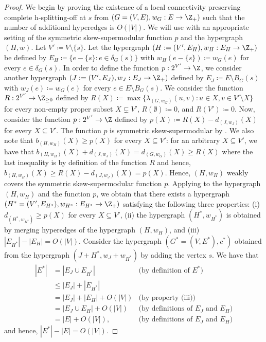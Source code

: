 \begin{proof}
    We begin by proving the existence of a local connectivity preserving complete h-splitting-off at $s$ from $(G=(V, E), w_G: E\rightarrow \Z_+)$ such that the number of additional hyperedges is $O(|V|)$. 
    We will use  with an appropriate setting of the symmetric skew-supermodular function $p$ and the hypergraph $(H, w)$. 
    Let $V'\coloneqq V\setminus \{s\}$. 
    Let the hypergraph $(H:=(V', E_H), w_H: E_H\rightarrow \Z_+)$ be defined by $E_H\coloneqq \{e-\{s\}: e\in \delta_G(s)\}$ with $w_H(e-\{s\})\coloneqq w_G(e)$ for every $e\in \delta_G(s)$. 
    In order to define the function $p: 2^{V'}\rightarrow \Z$, we consider another hypergraph $(J:=({V'}, E_J), w_J: E_J\rightarrow \Z_+)$ defined by $E_J\coloneqq E\setminus B_G(s)$ with $w_J(e)\coloneqq w_G(e)$ for every $e\in E\setminus B_G(s)$. 
    We consider the function $R:2^{V'}\rightarrow \Z_{\ge 0}$ defined by $R(X)\coloneqq \max\{\lambda_{(G, w_G)}(u, v): u\in X, v\in V'\setminus X\}$ for every non-empty proper subset $X\subsetneq  V'$, $R(\emptyset)\coloneqq 0$, and $R(V')\coloneqq 0$. 
    Now, consider the function $p: 2^{V'}\rightarrow \Z$ defined by $p(X)\coloneqq R(X)-d_{(J, w_J)}(X)$ for every $X\subseteq {V'}$. 
    The function $p$ is symmetric skew-supermodular by . 
    We also note that $b_{(H, w_H)}(X)\ge p(X)$ for every $X\subseteq {V'}$: for an arbitrary $X\subseteq {V'}$, we have that $b_{(H, w_H)}(X)+d_{(J, w_J)}(X)=d_{(G, w_G)}(X)\ge R(X)$ where the last inequality is by definition of the function $R$ and hence, $b_{(H, w_H)}(X)\ge R(X)-d_{(J, w_J)}(X)=p(X)$. 
    Hence, $(H,w_H)$ weakly covers the symmetric skew-supermodular function $p$. 
    Applying  to the hypergraph $(H, w_H)$ and the function $p$, we obtain that there exists a hypergraph $(H^* = (V', E_{H^*}), w_{H^*}: E_{H^*}\rightarrow \Z_+)$ satisfying the following three properties: (i) $d_{(H^*, w_{H^*})}\ge p(X)$ for every $X\subseteq V'$,  (ii) the hypergraph $(H^*, w_{H^*})$ is obtained by merging hyperedges of the hypergraph $(H, w_H)$, and (iii) $|E_{H^*}|-|E_H|=O(|V|)$. 
    Consider the hypergraph $(G^*=(V, E^*), c^*)$ obtained from the hypergraph $(J+H^*, w_J+w_{H^*})$ by adding the vertex $s$. 
    We have that 
    \begin{align*}
    |E^*|
    &=|E_J\cup E_{H^*}| &\text{(by definition of $E^*$)}\\
    &\le |E_J|+|E_{H^*}| &\\
    &=|E_J|+|E_H|+O(|V|) & \text{(by property (iii))}\\
    &=|E_J\cup E_H|+O(|V|) & \text{(by definitions of $E_J$ and $E_H$)}\\
    &=|E|+O(|V|), & \text{(by definitions of $E_J$ and $E_H$)}
    \end{align*}
    and hence, $|E^*|-|E|=O(|V|)$. 
    

\end{proof}

